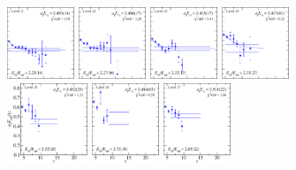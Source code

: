 \begin{figure}[H]
    \includegraphics[width=0.18\textwidth]{figures/sigmas/hu/fits/fit_14.pdf}
    \includegraphics[width=0.18\textwidth]{figures/sigmas/hu/fits/fit_20.pdf}
    \includegraphics[width=0.18\textwidth]{figures/sigmas/hu/fits/fit_19.pdf}
    \includegraphics[width=0.18\textwidth]{figures/sigmas/hu/fits/fit_25.pdf}\\
    \includegraphics[width=0.215\textwidth]{figures/sigmas/hu/fits/fit_29.pdf}
    \includegraphics[width=0.18\textwidth]{figures/sigmas/hu/fits/fit_30.pdf}
    \includegraphics[width=0.18\textwidth]{figures/sigmas/hu/fits/fit_27.pdf}

\end{figure}
